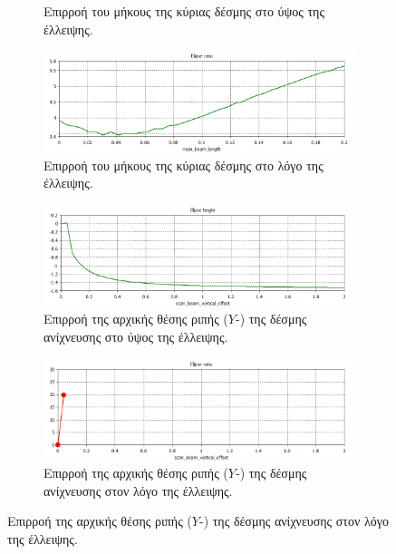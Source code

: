 \begin{figure}[tph]
\begin{subfigure}{0.47\textwidth}
		\centering
		\caption{Επιρροή του μήκους της κύριας δέσμης στο ύψος της έλλειψης.}
		\label{fig:CST-ellipse-height-by-bunch-length}
	\end{subfigure}
	\hfill	
	\begin{subfigure}{0.47\textwidth}
		\includegraphics[width=\linewidth]{figures/CST-variable-analysis/CST-ellipse-ratio-by-bunch-length}
		\centering
		\caption{Επιρροή του μήκους της κύριας δέσμης στο λόγο της έλλειψης.}
		\label{fig:CST-ellipse-ratio-by-bunch-length}
	\end{subfigure}		
	\par\bigskip
	\begin{subfigure}{0.47\textwidth}
		\includegraphics[width=\linewidth]{figures/CST-variable-analysis/CST-ellipse-height-by-vertical-offset}
		\centering
		\caption{Επιρροή της αρχικής θέσης ριπής ($Y$-) της δέσμης ανίχνευσης στο ύψος της έλλειψης.}
		\label{fig:CST-ellipse-height-by-vertical-offset}
	\end{subfigure}
	\hfill
	\begin{subfigure}{0.47\textwidth}
		\includegraphics[width=\linewidth]{figures/CST-variable-analysis/CST-ellipse-ratio-by-vertical-offset}
		\centering
		\caption{Επιρροή της αρχικής θέσης ριπής ($Y$-) της δέσμης ανίχνευσης στον λόγο της έλλειψης.}

\end{subfigure}
\end{figure}
